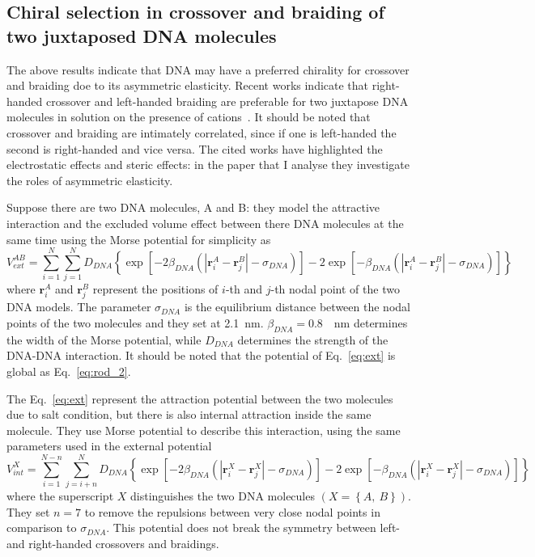\documentclass[a4paper,10pt]{article}
\begin{document}
\subsection{Chiral selection in crossover and braiding of two juxtaposed DNA molecules}\label{sec:braF}
The above results indicate that DNA may have a preferred chirality for crossover and braiding doe to its asymmetric elasticity.
Recent works indicate that right-handed crossover and left-handed braiding are preferable for two juxtapose DNA molecules in solution on the presence of cations~\cite{br_1, br_2, br_3, br_4, br_5}.
It should be noted that crossover and braiding are intimately correlated, since if one is left-handed the second is right-handed and vice versa.
The cited works have highlighted the electrostatic effects and steric effects: in the paper that I analyse they investigate the roles of asymmetric elasticity.

Suppose there are two DNA molecules, A and B: they model the attractive interaction and the excluded volume effect between there DNA molecules at the same time using the Morse potential for simplicity as
\begin{equation}\label{eq:ext}
V_{ext}^{AB}=\sum_{i=1}^{N}\sum_{j=1}^{N}D_{DNA}\left \{\exp\left [-2\beta_{DNA}\left (\left |\textbf{r}_{i}^{A}-\textbf{r}_{j}^{B}\right |-\sigma_{DNA}\right )\right ]-2\exp\left [-\beta_{DNA}\left (\left |\textbf{r}_{i}^{A}-\textbf{r}_{j}^{B}\right |-\sigma_{DNA}\right )\right ]\right \}
\end{equation}
where $\textbf{r}_{i}^{A}$ and $\textbf{r}_{j}^{B}$ represent the positions of $i$-th and $j$-th nodal point of the two DNA models.
The parameter $\sigma_{DNA}$ is the equilibrium distance between the nodal points of the two molecules and they set at \SI{2.1}{\nm}.
$\beta_{DNA}=$\SI{0.8}{\per\nm} determines the width of the Morse potential, while $D_{DNA}$ determines the strength of the DNA-DNA interaction.
It should be noted that the potential of Eq.~\ref{eq:ext} is global as Eq.~\ref{eq:rod_2}.

The Eq.~\ref{eq:ext} represent the attraction potential between the two molecules due to salt condition, but there is also internal attraction inside the same molecule.
They use Morse potential to describe this interaction, using the same parameters used in the external potential
\begin{equation}\label{eq:int}
V_{int}^{X}=\sum_{i=1}^{N-n}\sum_{j=i+n}^{N}D_{DNA}\left \{\exp\left [-2\beta_{DNA}\left (\left |\textbf{r}_{i}^{X}-\textbf{r}_{j}^{X}\right |-\sigma_{DNA}\right )\right ]-2\exp\left [-\beta_{DNA}\left (\left |\textbf{r}_{i}^{X}-\textbf{r}_{j}^{X}\right |-\sigma_{DNA}\right )\right ]\right \}
\end{equation}
where the superscript $X$ distinguishes the two DNA molecules $\left (X=\left \{A,\ B\right \}\right )$.
They set $n=7$ to remove the repulsions between very close nodal points in comparison to $\sigma_{DNA}$.
This potential does not break the symmetry between left- and right-handed crossovers and braidings.
\end{document}
